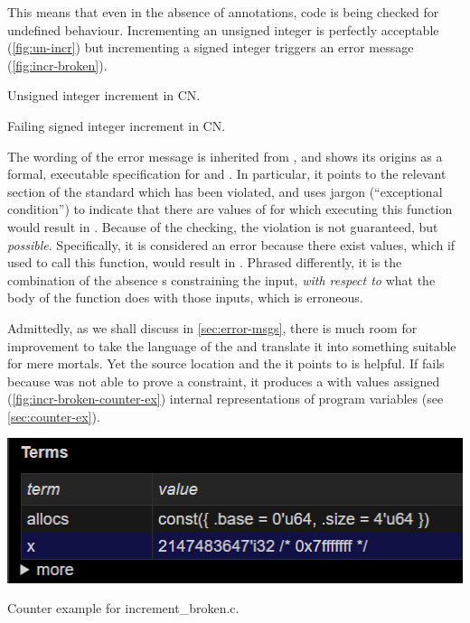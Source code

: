 This means that even in the absence of annotations, code is being checked for
undefined behaviour. Incrementing an unsigned integer is perfectly acceptable
(\cref{fig:un-incr}) but incrementing a signed integer triggers an error message
(\cref{fig:incr-broken}).

\begin{marginfigure}
    \centering
    \caption{Unsigned integer increment in CN.}\label{fig:un-incr}
\end{marginfigure}%

\begin{marginfigure}
    \centering
    \caption{Failing signed integer increment in CN.}\label{fig:incr-broken}
\end{marginfigure}%

The wording of the error message is inherited from , and shows its
origins as a formal, executable specification for  and 
. In particular, it points to the relevant section of the standard which
has been violated, and uses jargon (``exceptional condition'') to indicate that
there are values of  for which executing this function would result
in . Because of the  checking, the violation is not
guaranteed, but \emph{possible}. Specifically, it is considered an error
because there exist values, which if used to call this function, would result
in . Phrased differently, it is the combination of the absence
s constraining the input, \emph{with respect to} what the body
of the function does with those inputs, which is erroneous.

Admittedly, as we shall discuss in \cref{sec:error-msgs}, there is much room
for improvement to take the language of the  and
translate it into something suitable for mere mortals. Yet the source location
and the  it points to is helpful. If  fails
because  was not able to prove a constraint, it produces a
 with values assigned (\cref{fig:incr-broken-counter-ex})
internal representations of program variables (see \cref{sec:counter-ex}).

\begin{marginfigure}
    \centering
    \includegraphics[width=\textwidth]{figures/increment_broken_state.png}
    \caption{Counter example for increment\_broken.c.}\label{fig:incr-broken-counter-ex}
\end{marginfigure}

